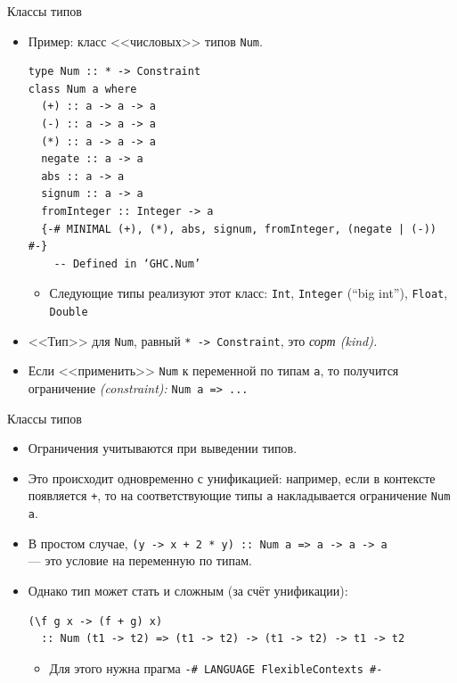 \documentclass[xcolor=dvipsnames]{beamer}
\begin{document}
\begin{frame}[fragile]{Классы типов}
 
 \begin{itemize}[<+->]
  \item Пример: класс <<числовых>> типов \texttt{Num}.
{\scriptsize
\begin{verbatim}
type Num :: * -> Constraint
class Num a where
  (+) :: a -> a -> a
  (-) :: a -> a -> a
  (*) :: a -> a -> a
  negate :: a -> a
  abs :: a -> a
  signum :: a -> a
  fromInteger :: Integer -> a
  {-# MINIMAL (+), (*), abs, signum, fromInteger, (negate | (-)) #-}
    -- Defined in ‘GHC.Num’
\end{verbatim}
}
\begin{itemize}
  \item Следующие типы реализуют этот класс: \texttt{Int},
  \texttt{Integer} (``big int''), \texttt{Float}, \texttt{Double}
\end{itemize}
 \item {<<Тип>>} для \texttt{Num}, равный \texttt{* -> Constraint}, это {\em сорт (kind).}
 \item Если <<применить>> \texttt{Num} к переменной по типам \texttt{a}, то получится ограничение {\em (constraint):} \texttt{Num a => ...}
 \end{itemize}

\end{frame}


\begin{frame}[fragile]{Классы типов}
 
 \begin{itemize}[<+->]
  \item Ограничения учитываются при выведении типов.
  \item Это происходит одновременно с унификацией: например, если в контексте появляется \texttt{+}, то на соответствующие типы \texttt{a} накладывается ограничение \texttt{Num a}.
  \item В простом случае, \texttt{(\x y -> x + 2 * y) :: Num a => a -> a -> a} \\
  --- это условие на переменную по типам.
  \item Однако тип может стать и сложным (за счёт унификации):
  \begin{verbatim}
(\f g x -> (f + g) x)
  :: Num (t1 -> t2) => (t1 -> t2) -> (t1 -> t2) -> t1 -> t2
  \end{verbatim}
    \begin{itemize}
    \item Для этого нужна прагма 
    \texttt{{-# LANGUAGE FlexibleContexts #-}}
    \end{itemize}
 \end{itemize}

\end{frame}
\end{document}
